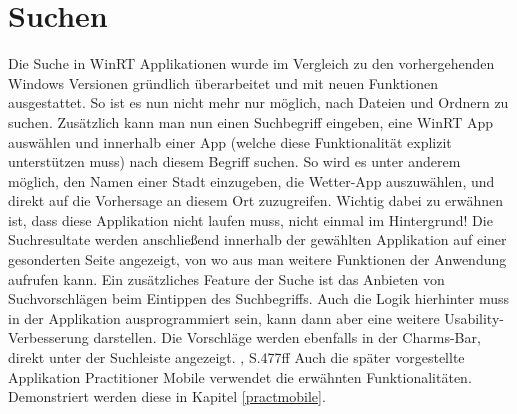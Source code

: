 \documentclass[a4paper,bibtotoc,oneside]{scrbook}
\begin{document}
\section[Suchen]{Suchen}
Die Suche in WinRT Applikationen wurde im Vergleich zu den vorhergehenden Windows Versionen gründlich überarbeitet und mit neuen Funktionen ausgestattet. So ist es nun nicht mehr nur möglich, nach Dateien und Ordnern zu suchen. Zusätzlich kann man nun einen Suchbegriff eingeben, eine WinRT App auswählen und innerhalb einer App (welche diese Funktionalität explizit unterstützen muss) nach diesem Begriff suchen. So wird es unter anderem möglich, den Namen einer Stadt einzugeben, die Wetter-App auszuwählen, und direkt auf die Vorhersage an diesem Ort zuzugreifen. Wichtig dabei zu erwähnen ist, dass diese Applikation nicht laufen muss, nicht einmal im Hintergrund!
\newline
Die Suchresultate werden anschließend innerhalb der gewählten Applikation auf einer gesonderten Seite angezeigt, von wo aus man weitere Funktionen der Anwendung aufrufen kann.
\newline
\newline
Ein zusätzliches Feature der Suche ist das Anbieten von Suchvorschlägen beim Eintippen des Suchbegriffs. Auch die Logik hierhinter muss in der Applikation ausprogrammiert sein, kann dann aber eine weitere Usability-Verbesserung darstellen. Die Vorschläge werden ebenfalls in der Charms-Bar, direkt unter der Suchleiste angezeigt.
\cite {ana12}, S.477ff
\newline
\newline
Auch die später vorgestellte Applikation Practitioner Mobile verwendet die erwähnten Funktionalitäten. Demonstriert werden diese in Kapitel \ref{practmobile}.
\end{document}
